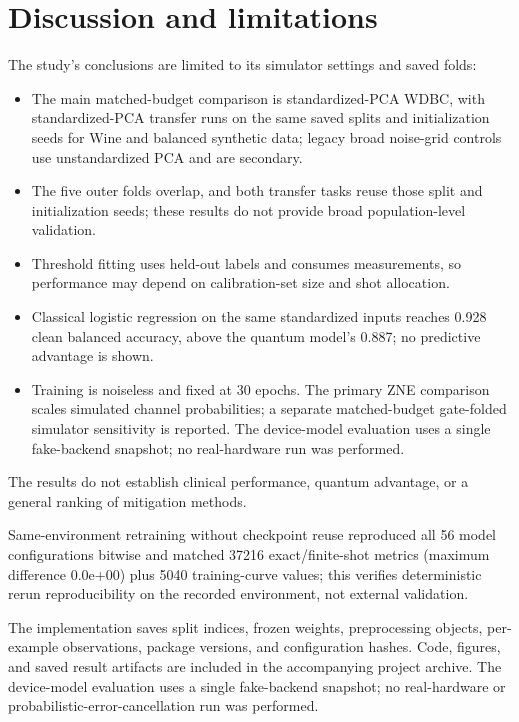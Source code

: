 \documentclass[conference]{IEEEtran}
\begin{document}
\section{Discussion and limitations}
The study's conclusions are limited to its simulator settings and saved folds:
\begin{itemize}
\item The main matched-budget comparison is standardized-PCA WDBC, with standardized-PCA transfer runs on the same saved splits and initialization seeds for Wine and balanced synthetic data; legacy broad noise-grid controls use unstandardized PCA and are secondary.
\item The five outer folds overlap, and both transfer tasks reuse those split and initialization seeds; these results do not provide broad population-level validation.
\item Threshold fitting uses held-out labels and consumes measurements, so performance may depend on calibration-set size and shot allocation.
\item Classical logistic regression on the same standardized inputs reaches 0.928 clean balanced accuracy, above the quantum model's 0.887; no predictive advantage is shown.
\item Training is noiseless and fixed at 30 epochs. The primary ZNE comparison scales simulated channel probabilities; a separate matched-budget gate-folded simulator sensitivity is reported. The device-model evaluation uses a single fake-backend snapshot; no real-hardware run was performed.
\end{itemize}
The results do not establish clinical performance, quantum advantage, or a general ranking of mitigation methods.

Same-environment retraining without checkpoint reuse reproduced all 56 model configurations bitwise and matched 37216 exact/finite-shot metrics (maximum difference 0.0e+00) plus 5040 training-curve values; this verifies deterministic rerun reproducibility on the recorded environment, not external validation.

The implementation saves split indices, frozen weights, preprocessing objects, per-example observations, package versions, and configuration hashes. Code, figures, and saved result artifacts are included in the accompanying project archive. The device-model evaluation uses a single fake-backend snapshot; no real-hardware or probabilistic-error-cancellation run was performed.
\end{document}
